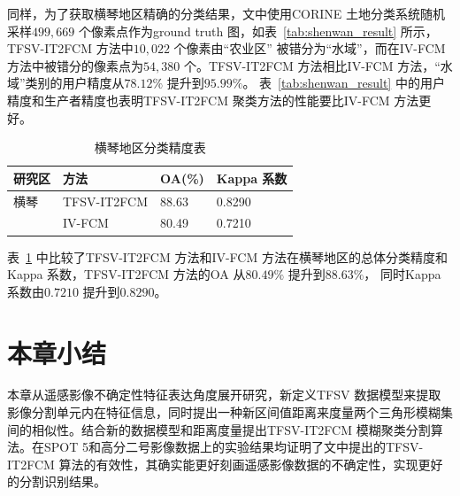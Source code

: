 同样，为了获取横琴地区精确的分类结果，文中使用CORINE 土地分类系统随机采样$499,669$ 个像素点作为ground truth 图，如表~\ref{tab:shenwan_result} 所示，TFSV-IT2FCM 方法中$10,022$ 个像素由“农业区” 被错分为“水域”，而在IV-FCM 方法中被错分的像素点为$54,380$ 个。TFSV-IT2FCM 方法相比IV-FCM 方法，“水域”类别的用户精度从$78.12\%$ 提升到$95.99\%$。 表~\ref{tab:shenwan_result} 中的用户精度和生产者精度也表明TFSV-IT2FCM 聚类方法的性能要比IV-FCM 方法更好。

\begin{table}[htbp]
    \caption{横琴地区分类精度表}\label{tab:hengqin_oa}
    \centering
    \begin{tabular}{llll}
        \toprule
        研究区 & 方法        & OA(\%) & Kappa 系数 \\
        \midrule
        横琴   & TFSV-IT2FCM & 88.63  & 0.8290     \\
               & IV-FCM      & 80.49  & 0.7210     \\
        \bottomrule
    \end{tabular}
\end{table}

表~\ref{tab:hengqin_oa} 中比较了TFSV-IT2FCM 方法和IV-FCM 方法在横琴地区的总体分类精度和Kappa 系数，TFSV-IT2FCM 方法的OA 从$80.49\%$ 提升到$88.63\%$， 同时Kappa 系数由$0.7210$ 提升到$0.8290$。


\section{本章小结}
\label{sec::chap04-5}
本章从遥感影像不确定性特征表达角度展开研究，新定义TFSV 数据模型来提取影像分割单元内在特征信息，同时提出一种新区间值距离来度量两个三角形模糊集间的相似性。结合新的数据模型和距离度量提出TFSV-IT2FCM 模糊聚类分割算法。在SPOT 5和高分二号影像数据上的实验结果均证明了文中提出的TFSV-IT2FCM 算法的有效性，其确实能更好刻画遥感影像数据的不确定性，实现更好的分割识别结果。%
